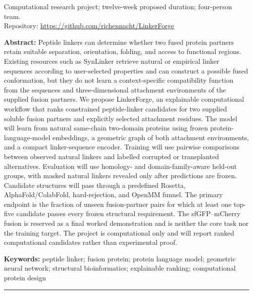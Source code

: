 \documentclass[10pt,a4paper]{article}
\begin{document}
\vspace{1.2em}
\begin{center}
\begin{minipage}{0.73\textwidth}
\small
Computational research project; twelve-week proposed duration; four-person team.\\
Repository: \url{https://github.com/richennacht/LinkerForge}

\vspace{1em}
\noindent\textbf{Abstract:}
Peptide linkers can determine whether two fused protein partners retain suitable separation, orientation, folding, and access to functional regions. Existing resources such as SynLinker retrieve natural or empirical linker sequences according to user-selected properties and can construct a possible fused conformation, but they do not learn a context-specific compatibility function from the sequences and three-dimensional attachment environments of the supplied fusion partners. We propose LinkerForge, an explainable computational workflow that ranks constrained peptide-linker candidates for two supplied soluble fusion partners and explicitly selected attachment residues. The model will learn from natural same-chain two-domain proteins using frozen protein-language-model embeddings, a geometric graph of both attachment environments, and a compact linker-sequence encoder. Training will use pairwise comparisons between observed natural linkers and labelled corrupted or transplanted alternatives. Evaluation will use homology- and domain-family-aware held-out groups, with masked natural linkers revealed only after predictions are frozen. Candidate structures will pass through a predefined Rosetta, AlphaFold/ColabFold, hard-rejection, and OpenMM funnel. The primary endpoint is the fraction of unseen fusion-partner pairs for which at least one top-five candidate passes every frozen structural requirement. The sfGFP--mCherry fusion is reserved as a final worked demonstration and is neither the core task nor the training target. The project is computational only and will report ranked computational candidates rather than experimental proof.

\vspace{0.75em}
\noindent\textbf{Keywords:} peptide linker; fusion protein; protein language model; geometric neural network; structural bioinformatics; explainable ranking; computational protein design
\end{minipage}
\end{center}

\vspace{0.65em}
\hrule
\vspace{0.45em}
\end{document}
